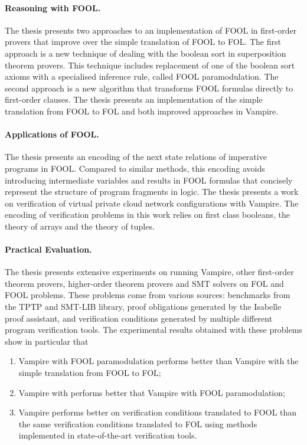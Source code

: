 \paragraph{Reasoning with FOOL.}
The thesis presents two approaches to an implementation of FOOL in first-order provers that improve over the simple translation of FOOL to FOL. The first approach is a new technique of dealing with the boolean sort in superposition theorem provers. This technique includes replacement of one of the boolean sort axioms with a specialised inference rule, called FOOL paramodulation. The second approach is a new algorithm \nfcnf{} that transforms FOOL formulas directly to first-order clauses. The thesis presents an implementation of the simple translation from FOOL to FOL and both improved approaches in Vampire.

\paragraph{Applications of FOOL.}
The thesis presents an encoding of the next state relations of imperative programs in FOOL. Compared to similar methods, this encoding avoids introducing intermediate variables and results in FOOL formulas that concisely represent the structure of program fragments in logic.
The thesis presents a work on verification of virtual private cloud network configurations with Vampire. The encoding of verification problems in this work relies on first class booleans, the theory of arrays and the theory of tuples.

\paragraph{Practical Evaluation.}
The thesis presents extensive experiments on running Vampire, other first-order theorem provers, higher-order theorem provers and SMT solvers on FOL and FOOL problems. These problems come from various sources: benchmarks from the TPTP and SMT-LIB library, proof obligations generated by the Isabelle proof assistant, and verification conditions generated by multiple different program verification tools. The experimental results obtained with these problems show in particular that \begin{enumerate}
  \item Vampire with FOOL paramodulation performs better than Vampire with the simple translation from FOOL to FOL;
  \item Vampire with \nfcnf{} performs better that Vampire with FOOL paramodulation;
  \item Vampire performs better on verification conditions translated to FOOL than the same verification conditions translated to FOL using methods implemented in state-of-the-art verification tools.
\end{enumerate}

